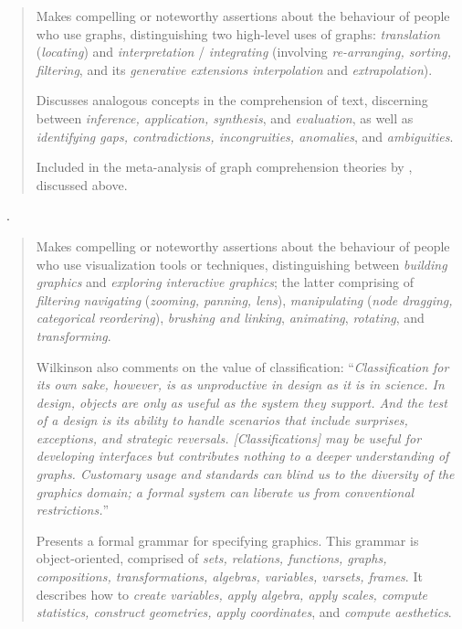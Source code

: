 \begin{quotation}
    Makes compelling or noteworthy assertions about the behaviour of people who use graphs, distinguishing two high-level uses of graphs: {\it translation} ({\it locating}) and {\it interpretation} / {\it integrating} (involving {\it re-arranging, sorting, filtering}, and its {\it generative extensions interpolation} and {\it extrapolation}).
    
    Discusses analogous concepts in the comprehension of text, discerning between {\it inference, application, synthesis}, and {\it evaluation}, as well as {\it identifying gaps, contradictions, incongruities, anomalies}, and {\it ambiguities}.
    
    Included in the meta-analysis of graph comprehension theories by \citet{Pohl2012}, discussed above.
\end{quotation}

\begin{sloppypar}
~\cite{Wilkinson2005}. \end{sloppypar}

\begin{quotation}
    Makes compelling or noteworthy assertions about the behaviour of people who use visualization tools or techniques, distinguishing between {\it building graphics} and {\it exploring interactive graphics}; the latter comprising of {\it filtering} {\it navigating} ({\it zooming, panning, lens}), {\it manipulating} ({\it node dragging, categorical reordering}), {\it brushing and linking}, {\it animating}, {\it rotating}, and {\it transforming}.
    
    \begin{sloppypar}
    Wilkinson also comments on the value of classification: ``{\it Classification for its own sake, however, is as unproductive in design as it is in science. In design, objects are only as useful as the system they support. And the test of a design is its ability to handle scenarios that include surprises, exceptions, and strategic reversals. [Classifications] may be useful for developing interfaces but contributes nothing to a deeper understanding of graphs. Customary usage and standards can blind us to the diversity of the graphics domain; a formal system can liberate us from conventional restrictions.}''
    \end{sloppypar}
    
    Presents a formal grammar for specifying graphics.
    This grammar is object-oriented, comprised of {\it sets, relations, functions, graphs, compositions, transformations, algebras, variables, varsets, frames}. 
    It describes how to {\it create variables, apply algebra, apply scales, compute statistics, construct geometries, apply coordinates}, and {\it compute aesthetics}.
\end{quotation}

